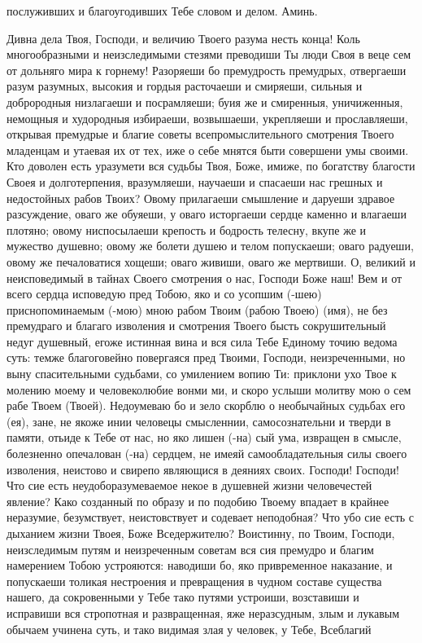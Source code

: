 \begin{mymulticols}
послуживших и благоугодивших Тебе словом и делом. Аминь. 

\end{mymulticols}

\mychapterending

 
\begin{mymulticols}

Дивна дела Твоя, Господи, и величию Твоего разума несть конца! Коль многообразными и неизследимыми стезями преводиши Ты люди Своя в веце сем от дольняго мира к горнему! Разоряеши бо премудрость премудрых, отвергаеши разум разумных, высокия и гордыя расточаеши и смиряеши, сильныя и доброродныя низлагаеши и посрамляеши; буия же и смиренныя, уничиженныя, немощныя и худородныя избираеши, возвышаеши, укрепляеши и прославляеши, открывая премудрые и благие советы всепромыслительного смотрения Твоего младенцам и утаевая их от тех, иже о себе мнятся быти совершени умы своими. Кто доволен есть уразумети вся судьбы Твоя, Боже, имиже, по богатству благости Своея и долготерпения, вразумляеши, научаеши и спасаеши нас грешных и недостойных рабов Твоих? Овому прилагаеши смышление и даруеши здравое разсуждение, оваго же обуяеши, у оваго исторгаеши сердце каменно и влагаеши плотяно; овому ниспосылаеши крепость и бодрость телесну, вкупе же и мужество душевно; овому же болети душею и телом попускаеши; оваго радуеши, овому же печаловатися хощеши; оваго живиши, оваго же мертвиши. О, великий и неисповедимый в тайнах Своего смотрения о нас, Господи Боже наш! Вем и от всего сердца исповедую пред Тобою, яко и со усопшим (-шею) приснопоминаемым (-мою) мною рабом Твоим (рабою Твоею) (имя), не без премудраго и благаго изволения и смотрения Твоего бысть сокрушительный недуг душевный, егоже истинная вина и вся сила Тебе Единому точию ведома суть: темже благоговейно повергаяся пред Твоими, Господи, неизреченными, но выну спасительными судьбами, со умилением вопию Ти: приклони ухо Твое к молению моему и человеколюбие вонми ми, и скоро услыши молитву мою о сем рабе Твоем (Твоей). Недоумеваю бо и зело скорблю о необычайных судьбах его (ея), зане, не якоже инии человецы смысленнии, самосознательни и тверди в памяти, отьиде к Тебе от нас, но яко лишен (-на) сый ума, извращен в смысле, болезненно опечалован (-на) сердцем, не имеяй самообладательныя силы своего изволения, неистово и свирепо являющися в деяниях своих. Господи! Господи! Что сие есть неудоборазумеваемое некое в душевней жизни человечестей явление? Како созданный по образу и по подобию Твоему впадает в крайнее неразумие, безумствует, неистовствует и содевает неподобная? Что убо сие есть с дыханием жизни Твоея, Боже Вседержителю? Воистинну, по Твоим, Господи, неизследимым путям и неизреченным советам вся сия премудро и благим намерением Тобою устрояются: наводиши бо, яко привременное наказание, и попускаеши толикая нестроения и превращения в чудном составе существа нашего, да сокровенными у Тебе тако путями устроиши, возставиши и исправиши вся стропотная и развращенная, яже неразсудным, злым и лукавым обычаем учинена суть, и тако видимая злая у человек, у Тебе, Всеблагий 
\end{mymulticols}
